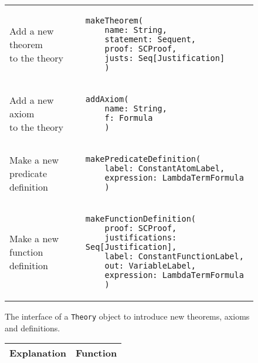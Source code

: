 {\begin{figure}[hp]
\begin{center}
\begin{tabular}{l|l}
          \makecell[l]{Add a new theorem \\to the theory} &
          \begin{lstlisting}[linewidth=19.5em]
  makeTheorem(
    name: String,
    statement: Sequent,
    proof: SCProof,
    justs: Seq[Justification]
    )
          \end{lstlisting}
          \\ %

          \makecell[l]{Add a new axiom   \\ to the theory} &
          \begin{lstlisting}[linewidth=19.5em]
  addAxiom(
    name: String,
    f: Formula
    )
          \end{lstlisting}
          \\ %

          \makecell[l]{Make a new        \\predicate definition} &
          \begin{lstlisting}[linewidth=19.5em]
  makePredicateDefinition(
    label: ConstantAtomLabel,
    expression: LambdaTermFormula
    )
          \end{lstlisting}
          \\ %

          \makecell[l]{Make a new        \\function definition} &
          \begin{lstlisting}[linewidth=19.5em]
  makeFunctionDefinition(
    proof: SCProof,
    justifications: Seq[Justification],
    label: ConstantFunctionLabel,
    out: VariableLabel,
    expression: LambdaTermFormula
    )
          \end{lstlisting}
          \\ %
        \end{tabular}
        \caption{The interface of a \lstinline|Theory|{} object to introduce new theorems, axioms and definitions.}

        \label{fig:theorysetters}
      \end{center}
    \end{figure}







    \iffalse
      \begin{figure}[hp]
        \begin{center}
          \begin{tabular}{l|l}
            Explanation & Function
            \\ \hline


\end{tabular}
\end{center}
\end{figure}}

